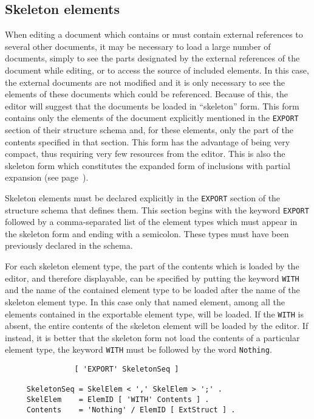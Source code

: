\subsection{Skeleton elements}
\label{squelette}

When editing a document which contains or must contain external
references to several other documents, it may be necessary to load a
large number of documents, simply to see the parts designated by the
external references of the document while editing, or to access the
source of included elements.  In this case, the external documents are
not modified and it is only necessary to see the elements of these
documents which could be referenced.  Because of this, the editor will
suggest that the documents be loaded in ``skeleton'' form.  This form
contains only the elements of the document explicitly mentioned in the
{\tt EXPORT} section of their structure schema and, for these
elements, only the part of the contents specified in that section.
This form has the advantage of being very compact, thus requiring very
few resources from the editor.  This is also the skeleton form which
constitutes the expanded form of inclusions with partial expansion
(see page~\pageref{inclusion}).

Skeleton elements must be declared explicitly in the {\tt EXPORT}
section of the structure schema that defines them.  This section
begins with the keyword {\tt EXPORT} followed by a comma-separated
list of the element types which must appear in the skeleton form and
ending with a semicolon.  These types must have been previously
declared in the schema.

For each skeleton element type, the part of the contents which is
loaded by the editor, and therefore displayable, can be specified by
putting the keyword {\tt WITH} and the name of the contained element
type to be loaded after the name of the skeleton element type.  In
this case only that named element, among all the elements contained in
the exportable element type, will be loaded.  If the {\tt WITH} is
absent, the entire contents of the skeleton element will be loaded
by the editor.  If instead, it is better that the skeleton form not
load the contents of a particular element type, the keyword
{\tt WITH} must be followed by the word {\tt Nothing}.

\begin{verbatim}
                [ 'EXPORT' SkeletonSeq ]

     SkeletonSeq = SkelElem < ',' SkelElem > ';' .
     SkelElem    = ElemID [ 'WITH' Contents ] .
     Contents    = 'Nothing' / ElemID [ ExtStruct ] .
\end{verbatim}

